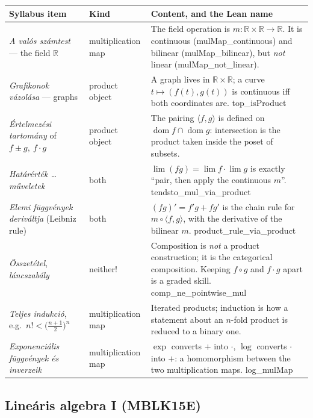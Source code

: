 \documentclass[11pt,a4paper]{article}
\theoremstyle{definition}
\newcommand{\lean}[1]{\textsf{\small #1}}
\begin{document}
\begin{longtable}{@{}p{}p{}p{}@{}}
\toprule
\textbf{Syllabus item} & \textbf{Kind} & \textbf{Content, and the Lean name}\\
\midrule
\endhead
\emph{A valós számtest} --- the field $\mathbb{R}$ &
multiplication map &
The field operation is $m:\mathbb{R}\times\mathbb{R}\to\mathbb{R}$.  It is continuous
(\lean{mulMap\_continuous}) and bilinear (\lean{mulMap\_bilinear}), but \emph{not} linear
(\lean{mulMap\_not\_linear}).\\
\emph{Grafikonok vázolása} --- graphs &
product object &
A graph lives in $\mathbb{R}\times\mathbb{R}$; a curve $t\mapsto(f(t),g(t))$ is continuous
iff both coordinates are. \lean{top\_isProduct}\\
\emph{Értelmezési tartomány} of $f\pm g,\ f\cdot g$ &
product object &
The pairing $\langle f,g\rangle$ is defined on $\operatorname{dom}f\cap\operatorname{dom}g$:
intersection is the product taken inside the poset of subsets.\\
\emph{Határérték \dots műveletek} &
both &
$\lim (fg)=\lim f\cdot\lim g$ is exactly ``pair, then apply the continuous $m$''.
\lean{tendsto\_mul\_via\_product}\\
\emph{Elemi függvények deriváltja} (Leibniz rule) &
both &
$(fg)'=f'g+fg'$ is the chain rule for $m\circ\langle f,g\rangle$, with the derivative of
the bilinear $m$. \lean{product\_rule\_via\_product}\\
\emph{Összetétel}, \emph{láncszabály} &
neither! &
Composition is \emph{not} a product construction; it is the categorical composition.
Keeping $f\circ g$ and $f\cdot g$ apart is a graded skill.
\lean{comp\_ne\_pointwise\_mul}\\
\emph{Teljes indukció}, e.g.\ $n!<\big(\tfrac{n+1}{2}\big)^n$ &
multiplication map &
Iterated products; induction is how a statement about an $n$-fold product is reduced to a
binary one.\\
\emph{Exponenciális függvények és inverzeik} &
multiplication map &
$\exp$ converts $+$ into $\cdot$, $\log$ converts $\cdot$ into $+$: a homomorphism between
the two multiplication maps. \lean{log\_mulMap}\\
\bottomrule
\end{longtable}

\subsection{Lineáris algebra I (MBLK15E)}
\end{document}
